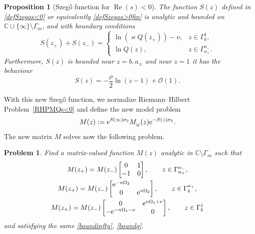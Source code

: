 \documentclass[pdftex]{sigma}
\numberwithin{equation}{section}
\newtheorem{Proposition}[Theorem]{Proposition}
\newtheorem{problem}[Theorem]{Problem}
\theoremstyle{definition}
\def\le{\left}
\def\ri{\right}
\def\nn{\nonumber}
\def\C{{\mathbb C}}
\def\s{\sigma}
\def \Re{\operatorname{Re} }
\begin{document}
\begin{Proposition}[Szeg\H{o} function for $\Re(s)<0$]\label{propSzegos<0}
The function $S(z)$ defined in \eqref{defSzegos<0} or equivalently \eqref{defSzegos>0fin} is analytic and bounded on $\C\cup \{\infty\}\setminus \Gamma_m$, and with boundary conditions
\[
S(z_+)+ S(z_-) =
\begin{cases}
\ln \le(\varkappa Q(z_+)\ri) - \nu,& z\in \Gamma_b^1,\\
\ln Q(z), & z\in \Gamma_{a_+}^{a_-}.
\end{cases}
\]
Furthermore, $S(z)$ is bounded near $z=b,a_\pm$ and near $z=1$ it has the behaviour
\[
S(z) = -\frac { {\rho}} 2\ln(z-1) + \mathcal O(1).
\]
\end{Proposition}
With this new Szeg\H{o} function, we normalize Riemann--Hilbert Problem~\ref{RHPMQs<0} and define the new model problem
\[
M(z):= {\rm e}^{S(\infty) \s_3} M_{_{Q}}(z) {\rm e}^{-S(z) \s_3}.
\]
The new matrix $M$ solves now the following problem.
\begin{problem}
\label{RHPMs<0}
Find a matrix-valued function $M(z)$ analytic in $\C \setminus \Gamma_m$ such that
\begin{gather}
M(z_+)= M(z_-) \begin{bmatrix}
0 & 1 \\
-1 & 0
\end{bmatrix}, \qquad z\in \Gamma_{a_+}^{a_-},
\nn
\\
M(z_+)= M(z_-) \begin{bmatrix}
{\rm e}^{-n\Omega_2}\\
0 & {\rm e}^{n\Omega_2}
\end{bmatrix},\qquad z\in \Gamma_b^{a_+},
\nn
\\
M(z_+)= M(z_-) \begin{bmatrix}
0 & {\rm e}^{n\Omega_1+\nu}\\
-{\rm e}^{-n\Omega_1-\nu}& 0
\end{bmatrix}, \qquad z\in \Gamma_b^{1}
\label{jumpMs<0}
\end{gather}
and satisfying the same \eqref{boundinfty}, \eqref{boundq}.
\end{problem}
\end{document}
